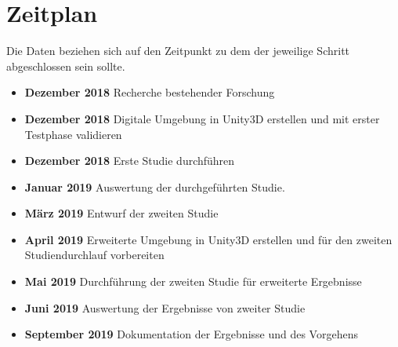 \documentclass[a4paper, 11pt]{article}
\begin{document}
\section*{Zeitplan}
Die Daten beziehen sich auf den Zeitpunkt zu dem der jeweilige Schritt abgeschlossen sein sollte.
\begin{itemize}
    \item \textbf{Dezember 2018} Recherche bestehender Forschung
    \item \textbf{Dezember 2018} Digitale Umgebung in Unity3D erstellen und mit erster Testphase validieren
    \item \textbf{Dezember 2018} Erste Studie durchführen
    \item \textbf{Januar 2019} Auswertung der durchgeführten Studie.
    \item \textbf{März 2019} Entwurf der zweiten Studie
    \item \textbf{April 2019} Erweiterte Umgebung in Unity3D erstellen und für den zweiten Studiendurchlauf vorbereiten
    \item \textbf{Mai 2019} Durchführung der zweiten Studie für erweiterte Ergebnisse
    \item \textbf{Juni 2019} Auswertung der Ergebnisse von zweiter Studie
    \item \textbf{September 2019} Dokumentation der Ergebnisse und des Vorgehens
\end{itemize}
\end{document}
